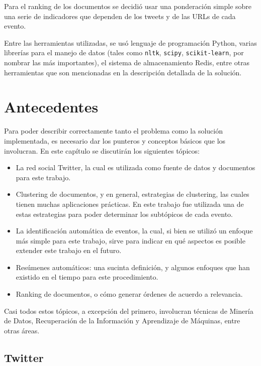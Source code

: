 \documentclass[upright, contnum]{umemoria}
\begin{document}
   Para el ranking de los documentos se decidió usar una ponderación
   simple sobre una serie de indicadores que dependen de los tweets y
   de las URLs de cada evento.

   Entre las herramientas utilizadas, se usó lenguaje de
   programación Python, varias librerías para el manejo de datos
   (tales como \texttt{nltk}, \texttt{scipy}, \texttt{scikit-learn}, por nombrar las más
   importantes), el sistema de almacenamiento Redis, entre otras
   herramientas que son mencionadas en la descripción detallada de la
   solución.

\chapter{Antecedentes}
\label{sec-2}

  
  Para poder describir correctamente tanto el problema como la
  solución implementada, es necesario dar los punteros y conceptos
  básicos que los involucran. En este capítulo se discutirán los
  siguientes tópicos:

\begin{itemize}
\item La red social Twitter, la cual es utilizada como fuente de datos y
    documentos para este trabajo.
\item Clustering de documentos, y en general, estrategias de clustering,
    las cuales tienen muchas aplicaciones prácticas. En este trabajo
    fue utilizada una de estas estrategias para poder determinar los
    subtópicos de cada evento.
\item La identificación automática de eventos, la cual, si bien se
    utilizó un enfoque más simple para este trabajo, sirve para
    indicar en qué aspectos es posible extender este trabajo en el
    futuro.
\item Resúmenes automáticos: una sucinta definición, y algunos enfoques
    que han existido en el tiempo para este procedimiento.
\item Ranking de documentos, o cómo generar órdenes de acuerdo a
    relevancia.
\end{itemize}
  Casi todos estos tópicos, a excepción del primero, involucran
  técnicas de Minería de Datos, Recuperación de la Información y
  Aprendizaje de Máquinas, entre otras áreas.

\section{Twitter}
\label{sec-2.1}
\end{document}
